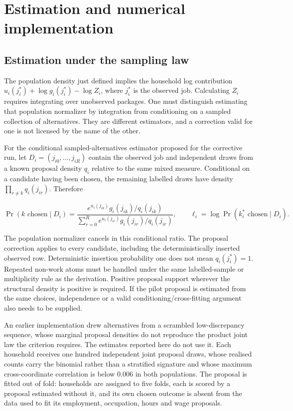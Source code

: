 \documentclass[11pt,a4paper]{article}
\begin{document}
\section{Estimation and numerical implementation}\label{estimation-and-numerical-implementation}

\subsection{Estimation under the sampling law}\label{estimation-under-the-sampling-law}

The population density just defined implies the household log contribution \(u_i(j_i^*)+\log g_i(j_i^*)-\log Z_i\), where \(j_i^*\) is the observed job. Calculating \(Z_i\) requires integrating over unobserved packages. One must distinguish estimating that population normalizer by integration from conditioning on a sampled collection of alternatives. They are different estimators, and a correction valid for one is not licensed by the name of the other.

For the conditional sampled-alternatives estimator proposed for the corrective run, let \(D_i=(j_{i0},\ldots,j_{iR})\) contain the observed job and independent draws from a known proposal density \(q_i\) relative to the same mixed measure. Conditional on a candidate having been chosen, the remaining labelled draws have density \(\prod_{r\ne k}q_i(j_{ir})\). Therefore

\[\Pr(k\text{ chosen}\mid D_i)=
\frac{e^{u_i(j_{ik})}g_i(j_{ik})/q_i(j_{ik})}
{\sum_{r=0}^R e^{u_i(j_{ir})}g_i(j_{ir})/q_i(j_{ir})},\qquad
\ell_i=\log\Pr(k_i^*\text{ chosen}\mid D_i).\]

The population normalizer cancels in this conditional ratio. The proposal correction applies to every candidate, including the deterministically inserted observed row. Deterministic insertion probability one does not mean \(q_i(j_i^*)=1\). Repeated non-work atoms must be handled under the same labelled-sample or multiplicity rule as the derivation. Positive proposal support wherever the structural density is positive is required. If the pilot proposal is estimated from the same choices, independence or a valid conditioning/cross-fitting argument also needs to be supplied.

An earlier implementation drew alternatives from a scrambled low-discrepancy sequence, whose marginal proposal densities do not reproduce the product joint law the criterion requires. The estimates reported here do not use it. Each household receives one hundred independent joint proposal draws, whose realised counts carry the binomial rather than a stratified signature and whose maximum cross-coordinate correlation is below \(0.006\) in both populations. The proposal is fitted out of fold: households are assigned to five folds, each is scored by a proposal estimated without it, and its own chosen outcome is absent from the data used to fit its employment, occupation, hours and wage proposals.
\end{document}
